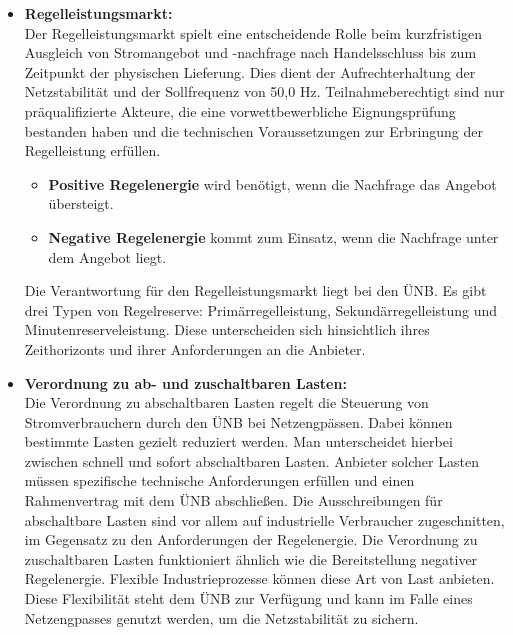 \begin{itemize}[label={--}]

\item \textbf{Regelleistungsmarkt:}\\
Der Regelleistungsmarkt spielt eine entscheidende Rolle beim kurzfristigen Ausgleich von Stromangebot und -nachfrage nach Handelsschluss bis zum Zeitpunkt der physischen Lieferung. Dies dient der Aufrechterhaltung der Netzstabilität und der Sollfrequenz von 50,0 Hz. Teilnahmeberechtigt sind nur präqualifizierte Akteure, die eine vorwettbewerbliche Eignungsprüfung bestanden haben und die technischen Voraussetzungen zur Erbringung der Regelleistung erfüllen.

\begin{itemize}[label={--}]
\item \textbf{Positive Regelenergie} wird benötigt, wenn die Nachfrage das Angebot übersteigt.
\item \textbf{Negative Regelenergie} kommt zum Einsatz, wenn die Nachfrage unter dem Angebot liegt.
\end{itemize}

Die Verantwortung für den Regelleistungsmarkt liegt bei den ÜNB. Es gibt drei Typen von Regelreserve: Primärregelleistung, Sekundärregelleistung und Minutenreserveleistung. Diese unterscheiden sich hinsichtlich ihres Zeithorizonts und ihrer Anforderungen an die Anbieter.\\

\item \textbf{Verordnung zu ab- und zuschaltbaren Lasten:}\\
Die Verordnung zu abschaltbaren Lasten regelt die Steuerung von Stromverbrauchern durch den ÜNB bei Netzengpässen. Dabei können bestimmte Lasten gezielt reduziert werden. Man unterscheidet hierbei zwischen schnell und sofort abschaltbaren Lasten. Anbieter solcher Lasten müssen spezifische technische Anforderungen erfüllen und einen Rahmenvertrag mit dem ÜNB abschließen. Die Ausschreibungen für abschaltbare Lasten sind vor allem auf industrielle Verbraucher zugeschnitten, im Gegensatz zu den Anforderungen der Regelenergie. Die Verordnung zu zuschaltbaren Lasten funktioniert ähnlich wie die Bereitstellung negativer Regelenergie. Flexible Industrieprozesse können diese Art von Last anbieten. Diese Flexibilität steht dem ÜNB zur Verfügung und kann im Falle eines Netzengpasses genutzt werden, um die Netzstabilität zu sichern.\\
\end{itemize}

